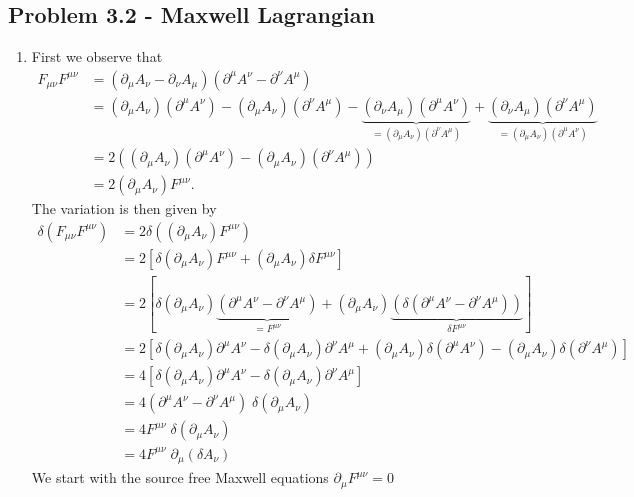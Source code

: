 \documentclass[../main.tex]{subfiles}
\begin{document}
\subsection{Problem 3.2 - Maxwell Lagrangian}
\begin{enumerate}
    \item First we observe that
    \begin{align}
        F_{\mu\nu}F^{\mu\nu}
        &=(\partial_\mu A_\nu-\partial_\nu A_\mu)(\partial^\mu A^\nu-\partial^\nu A^\mu)\\
        &=(\partial_\mu A_\nu)(\partial^\mu A^\nu)-(\partial_\mu A_\nu)(\partial^\nu A^\mu)-\underbrace{(\partial_\nu A_\mu)(\partial^\mu A^\nu)}_{=(\partial_\mu A_\nu)(\partial^\nu A^\mu)}+\underbrace{(\partial_\nu A_\mu)(\partial^\nu A^\mu)}_{=(\partial_\mu A_\nu)(\partial^\mu A^\nu)}\\
        &=2\left((\partial_\mu A_\nu)(\partial^\mu A^\nu)-(\partial_\mu A_\nu)(\partial^\nu A^\mu)\right)\\
        &=2(\partial_\mu A_\nu)F^{\mu\nu}.
    \end{align}
    The variation is then given by
    \begin{align}
        \delta\left(F_{\mu\nu}F^{\mu\nu}\right)
        &=2\delta\left((\partial_\mu A_\nu)F^{\mu\nu}\right)\\
        &=2\left[\delta\left(\partial_\mu A_\nu\right)F^{\mu\nu}+(\partial_\mu A_\nu)\delta F^{\mu\nu}\right]\\
        &=2[\delta\left(\partial_\mu A_\nu\right)\underbrace{(\partial^\mu A^\nu-\partial^\nu A^\mu)}_{=F^{\mu\nu}}+(\partial_\mu A_\nu)\underbrace{\left(\delta(\partial^\mu A^\nu-\partial^\nu A^\mu)\right)}_{\delta F^{\mu\nu}}]\\
        &=2\left[\delta\left(\partial_\mu A_\nu\right)\partial^\mu A^\nu-\delta\left(\partial_\mu A_\nu\right)\partial^\nu A^\mu+(\partial_\mu A_\nu)\delta(\partial^\mu A^\nu)-(\partial_\mu A_\nu)\delta(\partial^\nu A^\mu) \right]\\
        &=4\left[\delta\left(\partial_\mu A_\nu\right)\partial^\mu A^\nu-\delta\left(\partial_\mu A_\nu\right)\partial^\nu A^\mu \right]\\
        &=4(\partial^\mu A^\nu-\partial^\nu A^\mu)\;\delta(\partial_\mu A_\nu)\\
        &=4F^{\mu\nu}\;\delta(\partial_\mu A_\nu)\\
        &=4F^{\mu\nu}\;\partial_\mu(\delta A_\nu)
    \end{align}
    We start with the source free Maxwell equations $\partial_\mu F^{\mu\nu}=0$

\end{enumerate}
\end{document}
